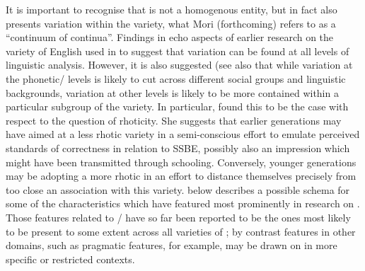 \documentclass[output=paper]{langsci/langscibook}
\begin{document}
It is important to recognise that  is not a homogenous entity, but in fact also presents variation within the variety, what Mori (forthcoming) refers to as a ``continuum of continua''. Findings in \citet{Grech2015} echo aspects of earlier research on the variety of English used in  to suggest that variation can be found at all levels of linguistic analysis. However, it is also suggested (see also \citealt{Vella1995, Bonnici2010} that while variation at the phonetic/ levels is likely to cut across different social groups and linguistic backgrounds, variation at other levels is likely to be more contained within a particular subgroup of the variety. In particular, \citet{Bonnici2010} found this to be the case with respect to the question of rhoticity. She suggests that earlier generations may have aimed at a less rhotic variety in a semi-conscious effort to emulate perceived standards of correctness in relation to SSBE, possibly also an impression which might have been transmitted through schooling. Conversely, younger generations may be adopting a more rhotic  in an effort to distance themselves precisely from too close an association with this variety.   below describes a possible schema for some of the characteristics which have featured most prominently in research on . Those features related to / have so far been reported to be the ones most likely to be present to some extent across all varieties of  \citep{Vella1995}; by contrast features in other domains, such as pragmatic features, for example, may be drawn on in more specific or restricted contexts. 
\end{document}
